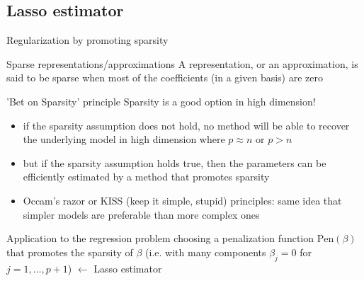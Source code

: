 \documentclass[compress, smaller, serif, 9pt]{beamer}
\newcommand{\structuretext}[1]{{\usebeamercolor[fg]{structure} #1}}
\newcommand{\doigt}{\structuretext{\noindent \Pisymbol{pzd}{43}}}
\begin{document}
\subsection{Lasso estimator}
\begin{frame}{Regularization by promoting sparsity}

\begin{block}{Sparse representations/approximations}
 A representation, or an approximation, is said to be sparse when most of the coefficients (in a given basis)  are zero
\end{block}


\begin{block}{'Bet on Sparsity' principle}
Sparsity is a good option in high dimension!
 \begin{itemize}
   \item if the sparsity assumption does not hold, no method will be able to recover the underlying model in high dimension where $p\approx n$ or $p>n$
   \item but if the sparsity assumption holds true, then the parameters can be efficiently estimated by
 a method that promotes sparsity
 \item[\doigt] Occam's razor or KISS (keep it simple, stupid) principles: same idea that simpler models are  preferable than more complex ones
 \end{itemize}
\end{block}

\begin{block}{Application to the regression problem}
choosing a penalization function $\textrm{Pen}(\beta)$ that promotes the 
 sparsity of $\beta$ (i.e. with many components $\beta_j=0$ for $j=1,\ldots,p+1$) $\leftarrow$ Lasso estimator
\end{block}

 
\end{frame}
\end{document}

